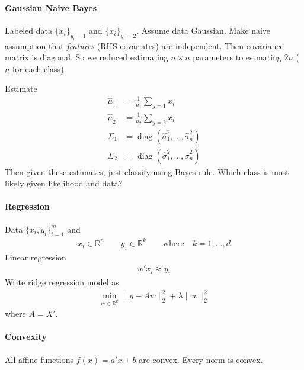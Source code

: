 \documentclass[12pt]{article}
\numberwithin{equation}{section} %
\theoremstyle{plain}
\theoremstyle{definition}
\theoremstyle{remark}
\newcommand{\diag}{\operatorname{diag}}
\newcommand{\R}{\mathbb{R}}
\newcommand{\Rn}{\mathbb{R}^n}
\newcommand{\Rk}{\mathbb{R}^k}
\begin{document}
\paragraph{Gaussian Naive Bayes}
Labeled data $\{x_i\}_{y_i=1}$ and $\{x_i\}_{y_i=2}$.
Assume data Gaussian.
Make naive assumption that \emph{features} (RHS covariates) are
independent.
Then covariance matrix is diagonal. So we reduced estimating $n\times n$
parameters to estmating $2n$ ($n$ for each class).

Estimate
\begin{align*}
  \hat{\mu}_1 &= \frac{1}{n_1}\sum_{y=1}x_i
  \\
  \hat{\mu}_2 &= \frac{1}{n_2}\sum_{y=2}x_i
  \\
  \hat{\Sigma}_1 &= \diag(\hat{\sigma}_1^2,\ldots,\hat{\sigma}_n^2)
  \\
  \hat{\Sigma}_2 &= \diag(\hat{\sigma}_1^2,\ldots,\hat{\sigma}_n^2)
\end{align*}
Then given these estimates, just classify using Bayes rule.
Which class is most likely given likelihood and data?


\paragraph{Regression}
Data $\{x_i,y_i\}_{i=1}^m$ and
\begin{align*}
  x_i\in\Rn
  \qquad
  y_i\in \R^k
  \qquad\text{where}\quad
  k=1,\ldots,d
\end{align*}
Linear regression
\begin{align*}
  w'x_i \approx y_i
\end{align*}
Write ridge regression model as
\begin{align*}
  \min_{w\in\Rk}
  \lVert y-A w\rVert_2^2
  + \lambda \lVert w\rVert_2^2
\end{align*}
where $A=X'$.


\paragraph{Convexity}
All affine functions $f(x)=a'x+b$ are convex.
Every norm is convex.
\end{document}
